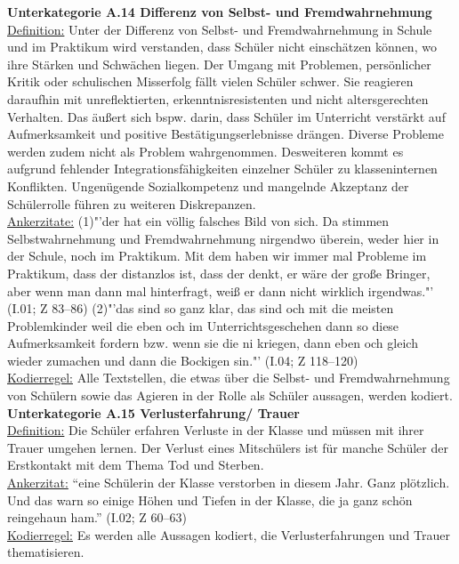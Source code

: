 \textbf{Unterkategorie A.14 Differenz von Selbst- und Fremdwahrnehmung}\\
\underline{Definition:} Unter der Differenz von Selbst- und Fremdwahrnehmung in Schule und im Praktikum wird verstanden, dass Schüler nicht einschätzen können, wo ihre Stärken und Schwächen liegen. Der Umgang mit Problemen, persönlicher Kritik oder schulischen Misserfolg fällt vielen Schüler schwer. Sie reagieren daraufhin mit unreflektierten, erkenntnisresistenten und nicht altersgerechten Verhalten. Das äußert sich bspw. darin, dass Schüler im Unterricht verstärkt auf Aufmerksamkeit und positive Bestätigungserlebnisse drängen. Diverse Probleme werden zudem nicht als Problem wahrgenommen. Desweiteren kommt es aufgrund fehlender Integrationsfähigkeiten einzelner Schüler zu klasseninternen Konflikten. Ungenügende Sozialkompetenz und mangelnde Akzeptanz der Schülerrolle führen zu weiteren Diskrepanzen.\\
\underline{Ankerzitate:} (1)"'der hat ein völlig falsches Bild von sich. Da stimmen Selbstwahrnehmung und Fremdwahrnehmung nirgendwo überein, weder hier in der Schule, noch im Praktikum. Mit dem haben wir immer mal Probleme im Praktikum, dass der distanzlos ist, dass der denkt, er wäre der große Bringer, aber wenn man dann mal hinterfragt, weiß er dann nicht wirklich irgendwas."' (I.01; Z 83--86) (2)"'das sind so ganz klar, das sind och mit die meisten Problemkinder weil die eben och im Unterrichtsgeschehen dann so diese Aufmerksamkeit fordern bzw.  wenn sie die ni kriegen, dann eben och gleich wieder zumachen und dann die Bockigen sin."' (I.04; Z 118--120)\\
\underline{Kodierregel:} Alle Textstellen, die etwas über die Selbst- und Fremdwahrnehmung von Schülern sowie das Agieren in der Rolle als Schüler aussagen, werden kodiert.\\

\textbf{Unterkategorie A.15 Verlusterfahrung/ Trauer}\\
\underline{Definition:} Die Schüler erfahren Verluste in der Klasse und müssen mit ihrer Trauer umgehen lernen. Der Verlust eines Mitschülers ist für manche Schüler der Erstkontakt mit dem Thema Tod und Sterben.\\
\underline{Ankerzitat:} "`eine Schülerin der Klasse verstorben in diesem Jahr. Ganz plötzlich. Und das warn so einige Höhen und Tiefen in der Klasse, die ja ganz schön reingehaun ham."' (I.02; Z 60--63)\\
\underline{Kodierregel:} Es werden alle Aussagen kodiert, die Verlusterfahrungen und Trauer thematisieren.\\

